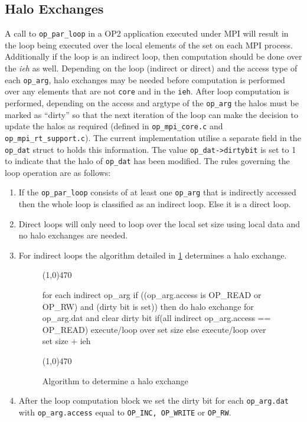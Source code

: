 \documentclass[11pt]{article}
\begin{document}
\subsection{Halo Exchanges}\label{subsec/exchange}
A call to \texttt{op\_par\_loop} in a OP2 application executed under MPI will result in the loop being executed over the
local elements of the set on each MPI process. Additionally if the loop is an indirect loop, then computation
should be done over the \textit{ieh} as well. Depending on the loop (indirect or direct) and the access type of each
\texttt{op\_arg}, halo exchanges may be needed before computation is performed over any elements that are not
\texttt{core} and in the \texttt{ieh}. After loop computation is performed, depending on the access and argtype of the
\texttt{op\_arg} the halos must be marked as ``dirty'' so that the next iteration of the loop can make the decision to
update the halos as required (defined in \texttt{op\_mpi\_core.c} and \texttt{op\_mpi\_rt\_support.c}). The current
implementation utilise a separate field in the \texttt{op\_dat} struct to holds this information. The value
\texttt{op\_dat->dirtybit} is set to 1 to indicate that the halo of \texttt{op\_dat} has been modified. The rules
governing the loop operation are as follows:
\begin{enumerate}
\item If the \texttt{op\_par\_loop} consists of at least one \texttt{op\_arg}
that is indirectly accessed then the whole loop is classified as an indirect
loop. Else it is a direct loop.

\item Direct loops will only need to loop over the local set size using local
data and no halo exchanges are needed.

\item For indirect loops the algorithm detailed in \figurename{ \ref{fig:haloexchange}} determines a halo exchange.

\begin{figure}[t]\small
\vspace{-0pt}\noindent\line(1,0){470}\vspace{-10pt}
\begin{pyglist}[language=c]
for each indirect op_arg {
  if ((op_arg.access is OP_READ or OP_RW) and (dirty bit is set))
  then do halo exchange for op_arg.dat and clear dirty bit
}
if(all indirect op_arg.access == OP_READ)
   execute/loop over set size
else
   execute/loop over set size + ieh
\end{pyglist}
\vspace{-10pt}\noindent\line(1,0){470}\vspace{-10pt}
\caption{\small Algorithm to determine a halo exchange}
\normalsize\vspace{-0pt}\label{fig:haloexchange}
\end{figure}

\item After the loop computation block we set the dirty bit for each
\texttt{op\_arg.dat} with \texttt{op\_arg.access} equal to \texttt{OP\_INC,
OP\_WRITE} or \texttt{OP\_RW}.
\end{enumerate}
\end{document}
